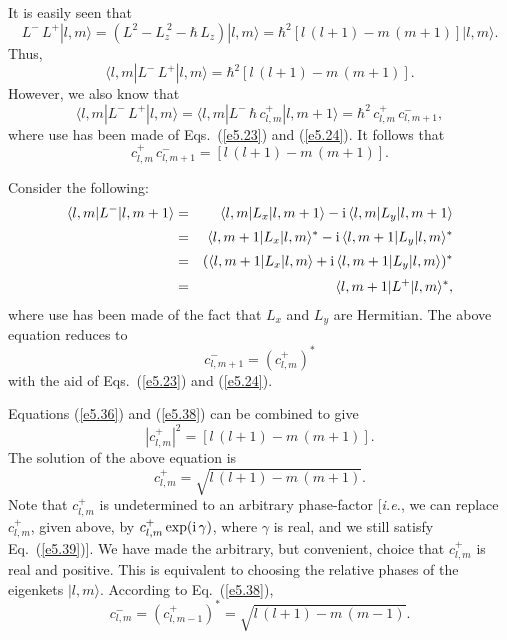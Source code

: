 It is easily seen that
\begin{equation}
L^- \,L^+ |l, m\rangle = (L^2 - L_z^{~2}-\hbar\, L_z)|l, m \rangle
= \hbar^2 [l\,(l+1) - m\,(m+1)]|l,m\rangle.
\end{equation}
Thus,
\begin{equation}
\langle l,m| L^- \,L^+| l,m\rangle =\hbar^2 [l\,(l+1) - m\,(m+1)].
\end{equation}
However, we also know that
\begin{equation}
\langle l,m| L^- \,L^+ |l,m\rangle = \langle l, m| L^-\, \hbar\, c^+_{l,m}
|l,m+1\rangle = \hbar^2\,  c^+_{l,m} \,c^{-}_{l, m+1},
\end{equation}
where use has been made of Eqs.~(\ref{e5.23}) and (\ref{e5.24}). 
It follows that
\begin{equation}\label{e5.36}
 c^+_{l,m}\, c^{-}_{l, m+1} = [l\,(l+1) - m\,(m+1)].
\end{equation}

Consider the following:
\begin{eqnarray}
\langle l, m| L^- |l, m+1\rangle &=&
\langle l, m| L_x|l,m+1 \rangle - {\rm i}\, \langle l, m| L_y|l,m+1 \rangle \nonumber
\\[0.5ex]
&=& \langle l, m+1| L_x|l,m \rangle^\ast - {\rm i}\, \langle l, m+1| L_y|l,m \rangle^\ast\nonumber\\[0.5ex]
&=&( \langle l, m+1| L_x|l,m \rangle + {\rm i}\, 
\langle l, m+1| L_y|l,m \rangle)^\ast\nonumber\\[0.5ex]
&=& \langle l, m+1|L^+|l, m\rangle^\ast,
\end{eqnarray}
where use has been made of the fact that $L_x$ and $L_y$ are Hermitian.
The above equation reduces to
\begin{equation}\label{e5.38}
c^-_{l, m+1} = (c_{l,m}^+)^\ast
\end{equation}
with the aid of Eqs.~(\ref{e5.23}) and (\ref{e5.24}). 

Equations (\ref{e5.36}) and (\ref{e5.38}) can be combined to give
\begin{equation}\label{e5.39}
|c^+_{l,m}|^2 = [l\,(l+1) - m \,(m+1)].
\end{equation}
The solution of the above equation is
\begin{equation}
c_{l, m}^+ = \sqrt{l\,(l+1)- m \,(m+1)}.
\end{equation}
Note that $c_{l,m}^+$ is undetermined to an arbitrary phase-factor
[{\em i.e.}, we can replace $c_{l, m}^+$, given above, by $c_{l, m}^+\exp({\rm i}\,\gamma)$,
where $\gamma$ is real, and we still satisfy Eq.~(\ref{e5.39})]. We have made the arbitrary, but convenient, choice that $c_{l,m}^+$ is real and positive. This is equivalent
to choosing  the relative phases of the eigenkets $|l, m\rangle$. 
According to Eq.~(\ref{e5.38}),
\begin{equation}\label{e5.41}
c_{l, m}^- = (c_{l, m-1}^+)^\ast =  \sqrt{l\,(l+1)- m\, (m-1)}.
\end{equation}

